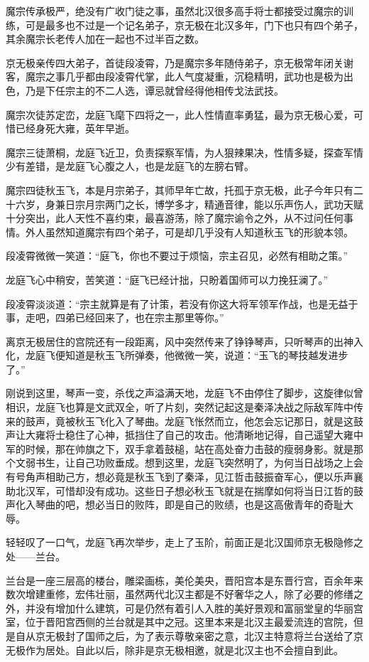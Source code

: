 魔宗传承极严，绝没有广收门徒之事，虽然北汉很多高手将士都接受过魔宗的训练，可是最多也不过是一个记名弟子，京无极在北汉多年，门下也只有四个弟子，其余魔宗长老传人加在一起也不过半百之数。

京无极亲传四大弟子，首徒段凌霄，乃是魔宗多年随侍弟子，京无极常年闭关谢客，魔宗之事几乎都由段凌霄代掌，此人气度凝重，沉稳精明，武功也是极为出色，乃是下任宗主的不二人选，谭忌就曾经得他相传戈法武技。

魔宗次徒苏定峦，龙庭飞麾下四将之一，此人性情直率勇猛，最为京无极心爱，可惜已经身死大雍，英年早逝。

魔宗三徒萧桐，龙庭飞近卫，负责探察军情，为人狠辣果决，性情多疑，探查军情少有差错，是龙庭飞心腹之人，也是龙庭飞的左膀右臂。

魔宗四徒秋玉飞，本是月宗弟子，其师早年亡故，托孤于京无极，此子今年只有二十六岁，身兼日宗月宗两门之长，博学多才，精通音律，能以乐声伤人，武功天赋十分突出，此人天性不喜约束，最喜游荡，除了魔宗谕令之外，从不过问任何事情。外人虽然知道魔宗有四个弟子，可是却几乎没有人知道秋玉飞的形貌本领。

段凌霄微微一笑道：“庭飞，你也不要过于烦恼，宗主召见，必然有相助之策。”

龙庭飞心中稍安，苦笑道：“庭飞已经计拙，只盼着国师可以力挽狂澜了。”

段凌霄淡淡道：“宗主就算是有了计策，若没有你这大将军领军作战，也是无益于事，走吧，四弟已经回来了，也在宗主那里等你。”

离京无极居住的宫院还有一段距离，风中突然传来了铮铮琴声，只听琴声的出神入化，龙庭飞便知道是秋玉飞所弹奏，他微微一笑，说道：“玉飞的琴技越发进步了。”

刚说到这里，琴声一变，杀伐之声溢满天地，龙庭飞不由停住了脚步，这旋律似曾相识，龙庭飞也算是文武双全，听了片刻，突然记起这是秦泽决战之际敌军阵中传来的鼓声，竟被秋玉飞化入了琴曲。龙庭飞怅然而立，他怎会忘记那日，就是这鼓声让大雍将士稳住了心神，抵挡住了自己的攻击。他清晰地记得，自己遥望大雍中军的时候，那在帅旗之下，双手拿着鼓槌，站在高处奋力击鼓的瘦弱身影。就是那个文弱书生，让自己功败垂成。想到这里，龙庭飞突然明了，为何当日战场之上会有号角声相助己方，想必竟是秋玉飞到了秦泽，见江哲击鼓振奋军心，便以乐声襄助北汉军，可惜却没有成功。这些日子想必秋玉飞就是在揣摩如何将当日江哲的鼓声化入琴曲的吧，想必当日的败阵，即是自己的败绩，也是这高傲青年的奇耻大辱。

轻轻叹了一口气，龙庭飞再次举步，走上了玉阶，前面正是北汉国师京无极隐修之处——兰台。

兰台是一座三层高的楼台，雕梁画栋，美伦美央，晋阳宫本是东晋行宫，百余年来数次增建重修，宏伟壮丽，虽然两代北汉主都是不好奢华之人，除了必要的修缮之外，并没有增加什么建筑，可是仍然有着引人入胜的美好景观和富丽堂皇的华丽宫室，位于晋阳宫西侧的兰台就是其中之冠。这里本来是北汉主最爱流连的宫院，但是自从京无极封了国师之后，为了表示尊敬亲密之意，北汉主特意将兰台送给了京无极作为居处。自此以后，除非是京无极相邀，就是北汉主也不会擅自到此。

